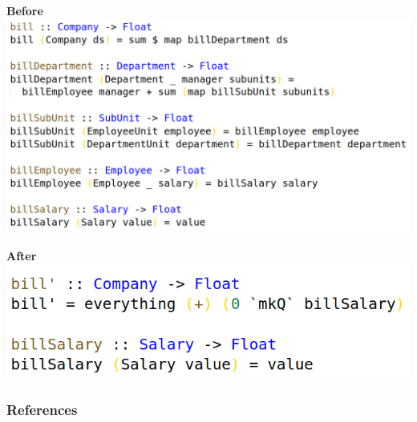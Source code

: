 \documentclass[14pt]{beamer}
\begin{document}
\begin{frame}
  \textbf{Before}
  \vfill
  \includegraphics[height=0.8\textheight,width=\textwidth,keepaspectratio]{graphics/bill-naive-hs.png}
  \vfill
\end{frame}

\begin{frame}
  \textbf{After}
  \vfill
  \includegraphics[height=0.8\textheight,width=\textwidth,keepaspectratio]{graphics/bill-hs.png}
  \vfill
\end{frame}

\begin{frame}[fragile]\frametitle{References}
  
\end{frame}
\end{document}
